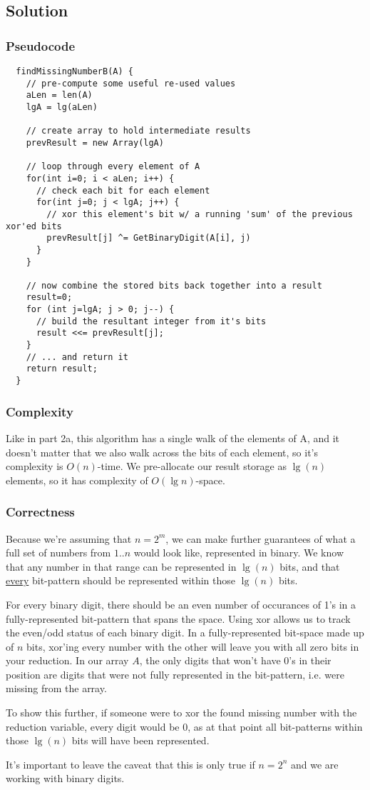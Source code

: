 \subsection*{Solution}
\subsubsection*{Pseudocode}
\begin{verbatim}
  findMissingNumberB(A) {
    // pre-compute some useful re-used values
    aLen = len(A)
    lgA = lg(aLen)

    // create array to hold intermediate results
    prevResult = new Array(lgA)

    // loop through every element of A
    for(int i=0; i < aLen; i++) {
      // check each bit for each element
      for(int j=0; j < lgA; j++) {
        // xor this element's bit w/ a running 'sum' of the previous xor'ed bits
        prevResult[j] ^= GetBinaryDigit(A[i], j)
      }
    }

    // now combine the stored bits back together into a result
    result=0;
    for (int j=lgA; j > 0; j--) {
      // build the resultant integer from it's bits
      result <<= prevResult[j];
    }
    // ... and return it
    return result;
  }
\end{verbatim}

\subsubsection*{Complexity}
Like in part 2a, this algorithm has a single walk of the elements of A, and it doesn't matter that we also walk across the bits of each element, so it's complexity is $O(n)$-time. We pre-allocate our result storage as $\lg(n) $elements, so it has complexity of $O(\lg n)$-space.

\subsubsection*{Correctness}
Because we're assuming that $n=2^{m}$, we can make further guarantees of what a full set of numbers from $1..n$ would look like, represented in binary. We know that any number in that range can be represented in $\lg(n)$ bits, and that \underline{every} bit-pattern should be represented within those $\lg(n)$ bits.

For every binary digit, there should be an even number of occurances of 1's in a fully-represented bit-pattern that spans the space. Using xor allows us to track the even/odd status of each binary digit. In a fully-represented bit-space made up of $n$ bits, xor'ing every number with the other will leave you with all zero bits in your reduction. In our array $A$, the only digits that won't have 0's in their position are digits that were not fully represented in the bit-pattern, i.e. were missing from the array.

To show this further, if someone were to xor the found missing number with the reduction variable, every digit would be 0, as at that point all bit-patterns within those $\lg(n)$ bits will have been represented.

It's important to leave the caveat that this is only true if $n=2^{n}$ and we are working with binary digits.
